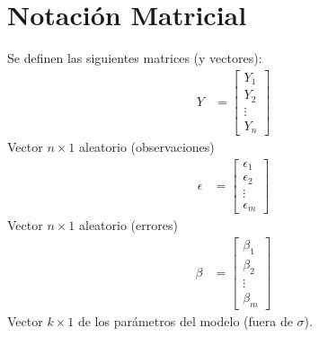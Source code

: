 \documentclass[10pt]{article}
\theoremstyle{plain}
\theoremstyle{definition}
\begin{document}
 \section{Notación Matricial}
 Se definen las siguientes matrices (y vectores):
 \begin{align*}
    Y &= \begin{bmatrix}
           Y_{1} \\
           Y_{2} \\
           \vdots \\
           Y_{n}
         \end{bmatrix}
  \end{align*}
  Vector $n\times 1$ aleatorio (observaciones)
  \begin{align*}
    \epsilon &= \begin{bmatrix}
           \epsilon_{1} \\
           \epsilon_{2} \\
           \vdots \\
           \epsilon_{m}
         \end{bmatrix}
  \end{align*}
  Vector $n\times 1$ aleatorio (errores)
    \begin{align*}
    \beta &= \begin{bmatrix}
           \beta_{1} \\
           \beta_{2} \\
           \vdots \\
           \beta_{m}
         \end{bmatrix}
  \end{align*}
  Vector $k\times 1$ de los parámetros del modelo (fuera de $\sigma$).\\
  
\end{document}
